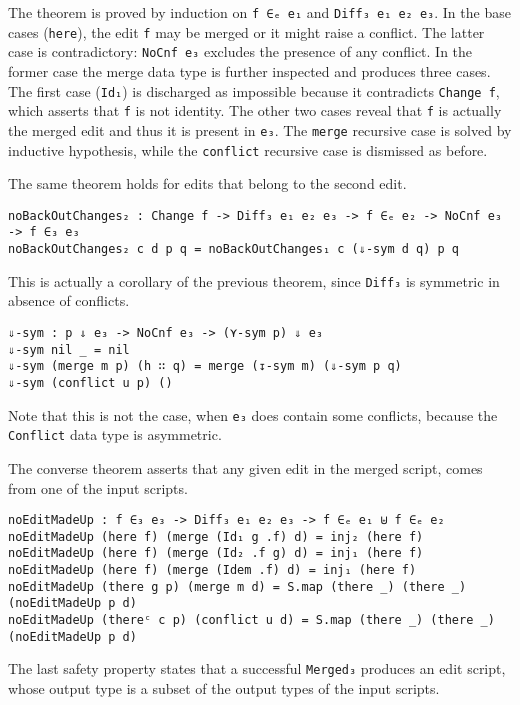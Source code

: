 \documentclass[../Thesis.tex]{subfiles}
\begin{document}
	The theorem is proved by induction on \texttt{f ∈ₑ e₁} and 
	\texttt{Diff₃ e₁ e₂ e₃}.
	In the base cases (\texttt{here}), the edit \texttt{f} may be merged or
	it might raise a conflict. The latter case is contradictory: \texttt{NoCnf e₃}
	excludes the presence of any conflict.
	In the former case the merge data type is further inspected and produces 
	three cases.
	The first case (\texttt{Id₁}) is discharged as impossible because it 
	contradicts \texttt{Change f}, which asserts that \texttt{f} is not identity.
	The other two cases reveal that \texttt{f} is actually the merged edit
	and thus it is present in \texttt{e₃}.
	The \texttt{merge} recursive case is solved by inductive hypothesis, while
	the \texttt{conflict} recursive case is dismissed as before.

	The same theorem holds for edits that belong to the second edit.
	
\begin{verbatim}
noBackOutChanges₂ : Change f -> Diff₃ e₁ e₂ e₃ -> f ∈ₑ e₂ -> NoCnf e₃ -> f ∈₃ e₃
noBackOutChanges₂ c d p q = noBackOutChanges₁ c (⇓-sym d q) p q
\end{verbatim}
	
	This is actually a corollary of the previous theorem, since
	\texttt{Diff₃} is symmetric in absence of conflicts.
	
\begin{verbatim}
⇓-sym : p ⇓ e₃ -> NoCnf e₃ -> (⋎-sym p) ⇓ e₃
⇓-sym nil _ = nil
⇓-sym (merge m p) (h ∷ q) = merge (↧-sym m) (⇓-sym p q)
⇓-sym (conflict u p) ()
\end{verbatim}	
	Note that this is not the case, when \texttt{e₃} does contain some conflicts,
	because the \texttt{Conflict} data type is asymmetric.
		
	The converse theorem asserts that any given edit in the merged script,
	comes from one of the input scripts.
	
\begin{verbatim}
noEditMadeUp : f ∈₃ e₃ -> Diff₃ e₁ e₂ e₃ -> f ∈ₑ e₁ ⊎ f ∈ₑ e₂
noEditMadeUp (here f) (merge (Id₁ g .f) d) = inj₂ (here f)
noEditMadeUp (here f) (merge (Id₂ .f g) d) = inj₁ (here f)
noEditMadeUp (here f) (merge (Idem .f) d) = inj₁ (here f)
noEditMadeUp (there g p) (merge m d) = S.map (there _) (there _) (noEditMadeUp p d)
noEditMadeUp (thereᶜ c p) (conflict u d) = S.map (there _) (there _) (noEditMadeUp p d)
\end{verbatim}

	The last safety property states that a successful \texttt{Merged₃}
	produces an edit script, whose output type is a subset of the output
	types of the input scripts.
	
\end{document}
